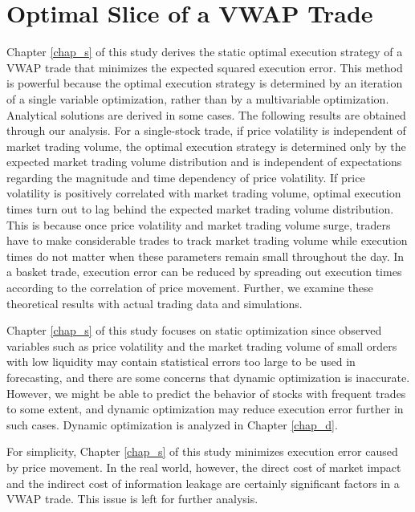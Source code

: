 \section{Optimal Slice of a VWAP Trade}\label{sec_c4}
Chapter \ref{chap_s} of this study derives the static optimal execution strategy of a VWAP trade that minimizes the expected squared execution error.  This method is powerful because the optimal execution strategy is determined by an iteration of a single variable optimization, rather than by a multivariable optimization.  Analytical solutions are derived in some cases.  The following results are obtained through our analysis.  For a single-stock trade, if price volatility is independent of market trading volume, the optimal execution strategy is determined only by the expected market trading volume distribution and is independent of expectations regarding the magnitude and time dependency of price volatility.  If price volatility is positively correlated with market trading volume, optimal execution times turn out to lag behind the expected market trading volume distribution.  This is because once price volatility and market trading volume surge, traders have to make considerable trades to track market trading volume while execution times do not matter when these parameters remain small throughout the day.  In a basket trade, execution error can be reduced by spreading out execution times according to the correlation of price movement.  Further, we examine these theoretical results with actual trading data and simulations.

Chapter \ref{chap_s} of this study focuses on static optimization since observed variables such as price volatility and the market trading volume of small orders with low liquidity may contain statistical errors too large to be used in forecasting, and there are some concerns that dynamic optimization is inaccurate.  However, we might be able to predict the behavior of stocks with frequent trades to some extent, and dynamic optimization may reduce execution error further in such cases.  Dynamic optimization is analyzed in Chapter \ref{chap_d}.

For simplicity, Chapter \ref{chap_s} of this study minimizes execution error caused by price movement.  In the real world, however, the direct cost of market impact and the indirect cost of information leakage are certainly significant factors in a VWAP trade.  This issue is left for further analysis.

